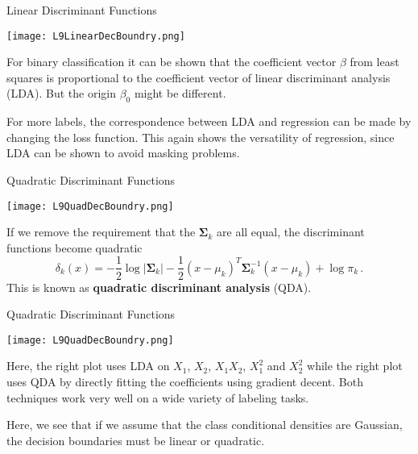 \documentclass[10pt, table, dvipsnames,xcdraw, handout]{beamer}
\begin{document}
\begin{frame}[fragile]{Linear Discriminant Functions}
  \begin{minipage}[t][0.5\textheight][t]{\textwidth}
	\centering \texttt{[image: L9LinearDecBoundry.png]} 
  \end{minipage}
  \vfill
\begin{minipage}[t][0.5\textheight][t]{\textwidth}
For binary classification it can be shown that the coefficient vector $\beta$ from least squares is proportional to the coefficient vector of linear discriminant analysis (LDA). But the origin $\beta_0$ might be different. \pause

For more labels, the correspondence between LDA and regression can be made by changing the loss function. This again shows the versatility of regression, since LDA can be shown to avoid masking problems. 
\end{minipage}
\end{frame}





\begin{frame}[fragile]{Quadratic Discriminant Functions}
  \begin{minipage}[t][0.5\textheight][t]{\textwidth}
	\centering \texttt{[image: L9QuadDecBoundry.png]} 
  \end{minipage}
  \vfill
\begin{minipage}[t][0.5\textheight][t]{\textwidth}
If we remove the requirement that the $\mathbf{\Sigma}_k$ are all equal, the discriminant functions become quadratic
$$
\delta_k(x) = -\frac12\log|\mathbf{\Sigma}_k| - \frac12 (x-\mu_k)^T\mathbf{\Sigma}_k^{-1}(x-\mu_k) + \log \pi_k\,.
$$\pause
This is known as \textbf{quadratic discriminant analysis} (QDA).
\end{minipage}
\end{frame}






\begin{frame}[fragile]{Quadratic Discriminant Functions}
  \begin{minipage}[t][0.5\textheight][t]{\textwidth}
	\centering \texttt{[image: L9QuadDecBoundry.png]} 
  \end{minipage}
  \vfill
\begin{minipage}[t][0.5\textheight][t]{\textwidth}
Here, the right plot uses LDA on $X_1$, $X_2$, $X_1X_2$, $X_1^2$ and $X_2^2$ while the right plot uses QDA by directly fitting the coefficients using gradient decent.  \pause Both techniques work very well on a wide variety of labeling tasks.

Here, we see that if we assume that the class conditional densities are Gaussian, the decision boundaries must be linear or quadratic.
\end{minipage}
\end{frame}
\end{document}

